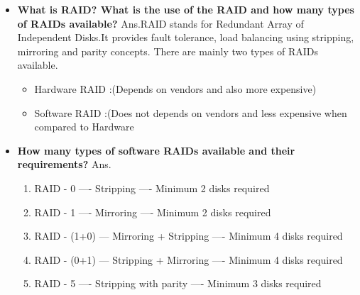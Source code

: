 \begin{enumerate}
\begin{enumerate}
{\begin{itemize}
\begin{itemize}
    \bigskip
    \bigskip

    \item \textbf{What is RAID? What is the use of the RAID and how many types of RAIDs available?}
    \newline
    Ans.RAID stands for Redundant Array of Independent Disks.It provides fault tolerance, load balancing using stripping, mirroring and parity concepts.
        There are mainly two types of RAIDs available.
        \begin{itemize}
          \item Hardware RAID :(Depends on vendors and also more expensive)
          \item  Software RAID :(Does not depends on vendors and less expensive when compared to Hardware 
        \end{itemize}

    \bigskip
    \bigskip

    \item \textbf{How many types of software RAIDs available and their requirements?}
    \newline
    Ans. \begin{enumerate}
             \item RAID - 0    ----	Stripping    ----	Minimum 2 disks required
             \item   RAID - 1    ----	Mirroring   ----	Minimum 2 disks required
             \item  RAID - (1+0)  ---	Mirroring + Stripping ----  Minimum 4 disks required
             \item  RAID - (0+1)  ---	Stripping + Mirroring ----  Minimum 4 disks required
             \item  RAID - 5    ----	Stripping with parity ----	  Minimum 3 disks required
          \end{enumerate}

    \bigskip
    \bigskip


\end{itemize}
\end{itemize}}
\end{enumerate}
\end{enumerate}
